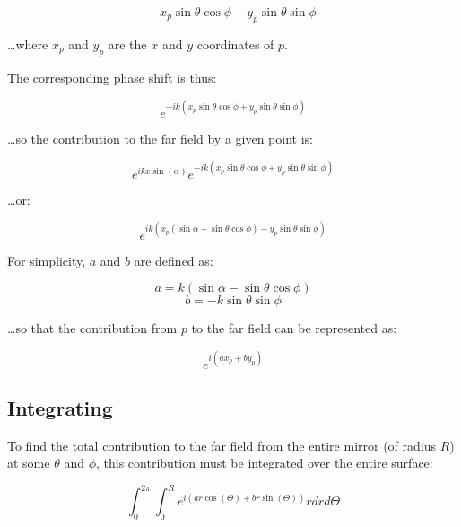 \documentclass[etd,twoside,senior,noacknowledgments]{BYUPhys}
\begin{document}
\begin{equation}
  -x_p\sin{\theta}\cos{\phi}-y_p\sin{\theta}\sin{\phi}
\end{equation}

\ldots where $x_p$ and $y_p$ are the $x$ and $y$ coordinates of $p$.

The corresponding phase shift is thus:

\begin{equation}
  e^{-ik(x_p\sin{\theta}\cos{\phi}+y_p\sin{\theta}\sin{\phi})}
\end{equation}

\ldots so the contribution to the far field by a given point is:

\begin{equation}
  e^{ikx\sin\left({\alpha}\right)}e^{-ik(x_p\sin{\theta}\cos{\phi}+y_p\sin{\theta}\sin{\phi})}
\end{equation}

\ldots or:

\begin{equation}
  e^{ik\left(x_p(\sin{\alpha}-\sin{\theta}\cos{\phi})-y_p\sin{\theta}\sin{\phi}\right)}
\end{equation}

For simplicity, $a$ and $b$ are defined as:

\begin{equation}
  a = k\left(\sin{\alpha}-\sin{\theta}\cos{\phi}\right)
\end{equation}
\begin{equation}
  b = -k\sin{\theta}\sin{\phi}
\end{equation}

\ldots so that the contribution from $p$ to the far field can be represented as:

\begin{equation}
  e^{i(ax_p+by_p)}
\end{equation}

\subsection{Integrating} \label{sec:integrating}

To find the total contribution to the far field from the entire mirror (of radius $R$) at some $\theta$ and $\phi$, this contribution must be integrated over the entire surface:

\begin{equation}\label{eq:integral1}
  \int_0^{2\pi}\int_0^R e^{i(ar\cos(\Theta)+br\sin(\Theta))} rdrd\Theta
\end{equation}
\end{document}
